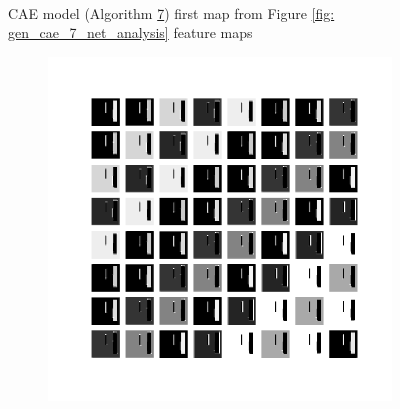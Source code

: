 \begin{figure}
\begin{subfigure}[b]{0.40\linewidth}
    \end{subfigure}
    \\[-0.5cm]
    \caption{CAE model (Algorithm \hyperref[tab: evalalgorithms]{7}) first map from Figure \ref{fig: gen_cae_7_net_analysis} feature maps}
    \label{fig: gen_cae_7_feature_maps_1}
\end{figure}

\begin{figure}
    \centering
    \begin{subfigure}[b]{0.4\linewidth}
        \includegraphics[width=\linewidth]{images/cae_online_lstm/caelstm_section_cae_training_block_map_10000_model_feature_maps_map_1_0_3.png}
    \end{subfigure}
    \hfill
    \begin{subfigure}[b]{0.4\linewidth}

\end{subfigure}
\end{figure}
